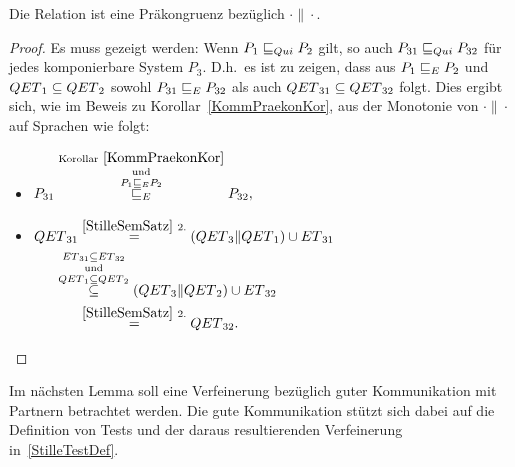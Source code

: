 \begin{Kor}
  \label{StillePraekonKor}
  Die Relation \QRel{} ist eine Präkongruenz bezüglich $\cdot\|\cdot$.
\end{Kor}
\begin{proof}
  Es muss gezeigt werden: Wenn $P_1 \sqsubseteq  _{Qui} P_2$ gilt, so auch $P_{31} \sqsubseteq  _{Qui}
  P_{32}$ für jedes komponierbare System $P_3$. D.h.\ es ist zu zeigen, dass
  aus $P_1 \sqsubseteq  _E P_2$ und $QET{}_1\subseteq QET{}_2$ sowohl $P_{31} \sqsubseteq  _E
  P_{32}$ als auch $QET{}_{31}\subseteq QET{}_{32}$ folgt. Dies ergibt sich,
  wie im Beweis zu Korollar~\ref{KommPraekonKor}, aus der Monotonie von
  $\cdot\|\cdot$ auf Sprachen wie folgt:
  \begin{itemize}
    \item $\begin{aligned}[t]
        P_{31} \overset{\mathrm{Korollar}~\ref{KommPraekonKor}}{
          \overset{\mathrm{und}}{\overset{P_1 \sqsubseteq  _E P_2}{ \sqsubseteq  _E}}}
        P_{32},
    \end{aligned}$
    \item $\begin{aligned}[t]
        \QET{}_{31} &\overset{\ref{StilleSemSatz}~2.}{=}
        (\QET{}_3\|\QET{}_1)\cup \ET{}_{31}\\
        &\hspace{-0.6cm}\overset{\ET{}_{31}\subseteq
      \ET{}_{32}}{\overset{\mathrm{und}}{\overset{\QET{}_1\subseteq
      \QET{}_2}{\subseteq}}} (\QET{}_3\|\QET{}_2) \cup \ET{}_{32}\\
        &\overset{\ref{StilleSemSatz}~2.}{=} \QET{}_{32}.
    \end{aligned}$
  \vspace*{-0.7cm}
  \end{itemize}
\end{proof}

Im nächsten Lemma soll eine Verfeinerung bezüglich guter Kommunikation mit
Partnern betrachtet werden. Die gute Kommunikation stützt sich dabei auf die
Definition von Tests und der daraus resultierenden Verfeinerung
in~\ref{StilleTestDef}.

